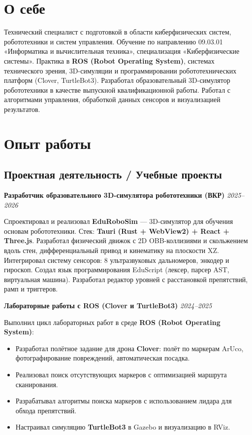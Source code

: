 \documentclass[10pt,a4paper]{article}
\newcommand{\projectEntry}[3]{\textbf{#1} \hfill \textit{#2}\par #3\par\vspace{0.3em}}
\begin{document}

\section{О себе}

Технический специалист с подготовкой в области киберфизических систем, робототехники и систем управления. Обучение по направлению 09.03.01 «Информатика и вычислительная техника», специализация «Киберфизические системы». Практика в \textbf{ROS (Robot Operating System)}, системах технического зрения, 3D-симуляции и программировании робототехнических платформ (Clover, TurtleBot3). Разработал образовательный 3D-симулятор робототехники в качестве выпускной квалификационной работы. Работал с алгоритмами управления, обработкой данных сенсоров и визуализацией результатов.

\section{Опыт работы}

\subsection{Проектная деятельность / Учебные проекты}

\projectEntry{Разработчик образовательного 3D-симулятора робототехники (ВКР)}{2025--2026}
{Спроектировал и реализовал \textbf{EduRoboSim} --- 3D-симулятор для обучения основам робототехники. Стек: \textbf{Tauri (Rust + WebView2) + React + Three.js}. Разработал физический движок с 2D OBB-коллизиями и скольжением вдоль стен, дифференциальный привод и кинематику на плоскости XZ. Интегрировал систему сенсоров: 8 ультразвуковых дальномеров, энкодер и гироскоп. Создал язык программирования EduScript (лексер, парсер AST, виртуальная машина). Разработал редактор уровней с расстановкой препятствий, рамп и триггеров.}

\projectEntry{Лабораторные работы с ROS (Clover и TurtleBot3)}{2024--2025}
{Выполнил цикл лабораторных работ в среде \textbf{ROS (Robot Operating System)}:
\begin{itemize}
    \item Разработал полётное задание для дрона \textbf{Clover}: полёт по маркерам ArUco, фотографирование повреждений, автоматическая посадка.
    \item Реализовал поиск отсутствующих маркеров с оптимизацией маршрута сканирования.
    \item Разрабатывал алгоритмы поиска маркеров с использованием лидара для обхода препятствий.
    \item Настраивал симуляцию \textbf{TurtleBot3} в Gazebo и визуализацию в RViz.
\end{itemize}}
\end{document}
